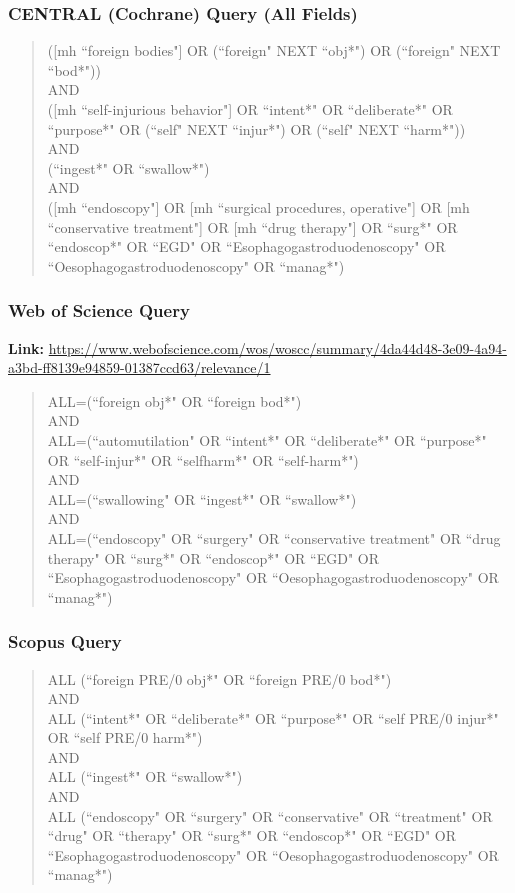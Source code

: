 \begin{appendices}
\subsubsection{CENTRAL (Cochrane) Query (All Fields)}
\begin{quote}
([mh ``foreign bodies"] OR (``foreign" NEXT ``obj*") OR (``foreign" NEXT ``bod*"))\\
AND\\
([mh ``self-injurious behavior"] OR ``intent*" OR ``deliberate*" OR ``purpose*" OR (``self" NEXT ``injur*") OR (``self" NEXT ``harm*"))\\
AND\\
(``ingest*" OR ``swallow*")\\
AND\\
([mh ``endoscopy"] OR [mh ``surgical procedures, operative"] OR [mh ``conservative treatment"] OR [mh ``drug therapy"] OR ``surg*" OR ``endoscop*" OR ``EGD" OR ``Esophagogastroduodenoscopy" OR ``Oesophagogastroduodenoscopy" OR ``manag*")
\end{quote}

\subsubsection{Web of Science Query}
\textbf{Link:} \url{https://www.webofscience.com/wos/woscc/summary/4da44d48-3e09-4a94-a3bd-ff8139e94859-01387ccd63/relevance/1}
\begin{quote}
ALL=(``foreign obj*" OR ``foreign bod*")\\
AND\\
ALL=(``automutilation" OR ``intent*" OR ``deliberate*" OR ``purpose*" OR ``self-injur*" OR ``selfharm*" OR ``self-harm*")\\
AND\\
ALL=(``swallowing" OR ``ingest*" OR ``swallow*")\\
AND\\
ALL=(``endoscopy" OR ``surgery" OR ``conservative treatment" OR ``drug therapy" OR ``surg*" OR ``endoscop*" OR ``EGD" OR ``Esophagogastroduodenoscopy" OR ``Oesophagogastroduodenoscopy" OR ``manag*")
\end{quote}

\subsubsection{Scopus Query}
\begin{quote}
ALL (``foreign PRE/0 obj*" OR ``foreign PRE/0 bod*")\\
AND\\
ALL (``intent*" OR ``deliberate*" OR ``purpose*" OR ``self PRE/0 injur*" OR ``self PRE/0 harm*")\\
AND\\
ALL (``ingest*" OR ``swallow*")\\
AND\\
ALL (``endoscopy" OR ``surgery" OR ``conservative" OR ``treatment" OR ``drug" OR ``therapy" OR ``surg*" OR ``endoscop*" OR ``EGD" OR ``Esophagogastroduodenoscopy" OR ``Oesophagogastroduodenoscopy" OR ``manag*")
\end{quote}


\end{appendices}
